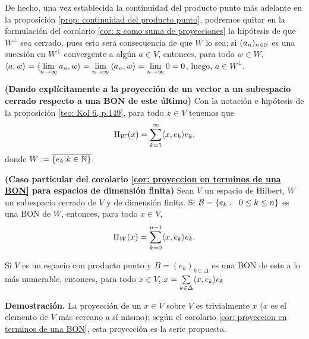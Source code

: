\begin{nota}
De hecho, una vez establecida la continuidad
del producto punto más adelante en la
proposición \ref{prop: continuidad del producto punto}, podremos
quitar en la formulación del corolario 
\ref{cor: x como suma de proyecciones}
la hipótesis de que $W^{\perp}$ sea cerrado, pues esto
será consecuencia de que $W$ lo sea; si $(a_{n})_{n \in \mathbb{N}}$
es una sucesión en $W^{\perp}$ convergente a algún $a \in V$,
entonces, para todo $w \in W$,
$\langle a, w \rangle = 
\langle \lim\limits_{n \rightarrow \infty}{a_{n}}, w \rangle
= \lim\limits_{n \rightarrow \infty}{\langle a_{n},w \rangle}=
\lim\limits_{n \rightarrow \infty}{0}=0$,
luego, $a \in W^{\perp}$.
\end{nota}

\begin{cor} \label{cor: proyeccion en terminos de una BON}
\textbf{(Dando explícitamente a la proyección de un vector
a un subespacio cerrado respecto a una BON de este último)}
Con la notación 
e hipótesis
de la proposición \ref{teo: Kol 6, p.149},
para todo $x \in V$
tenemos que
\[
\Pi_{W}(x) = \sum\limits_{k=1}^{\infty} \langle x, e_{k} \rangle e_{k},
\]
donde $W := \overline{\{e_{k}| k \in \mathbb{N} \}}$. 
\end{cor}

\begin{cor}
\label{cor: proyeccion en terminos de BON}
\textbf{(Caso particular del
corolario \ref{cor: proyeccion en terminos de una BON} para
espacios de dimensión finita)}
Sean $V$ un espacio de Hilbert, $W$ un subespacio cerrado de $V$
y de dimensión finita. Si 
$\mathcal{B} = \{ e_{k}: \hspace{0.2cm} 0 \leq k \leq n \}$
es una BON de $W$, entonces, para todo $x \in V$,
\[
\Pi_{W}(x) = \sum\limits_{k=0}^{n-1} \langle x, e_{k} \rangle e_{k}.
\]  
\end{cor}


\begin{cor} \label{cor: representacion de un vector respecto a una BON}
Si $V$ es un espacio con producto punto 
y $B=(e_{k})_{k \in \Delta}$ es una BON de este
a lo más numerable, entonces, para todo
$x \in V$, $x = \sum\limits_{k \in \Delta}^{}\langle x, e_{k} \rangle e_{k}$
\end{cor}
\noindent
\textbf{Demostración.}
La proyección de un $x \in V$ sobre $V$ es trivialmente $x$
($x$ es el elemento de $V$ más cercano a sí mismo); según el corolario
\ref{cor: proyeccion en terminos de una BON}, esta
proyección es la serie propuesta. \QEDB
\vspace{0.2cm}



